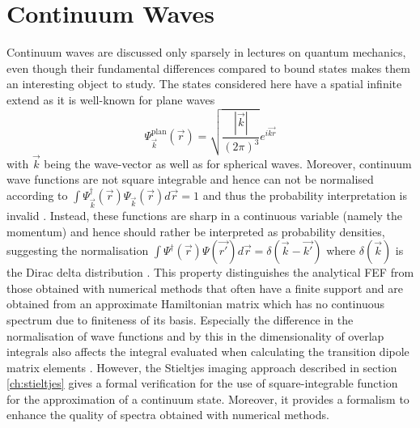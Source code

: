 \section{Continuum Waves}
\label{ch:contwa}
Continuum waves are discussed only sparsely in lectures on quantum mechanics, even though their fundamental differences compared to bound states makes them an interesting object to study.
The states considered here have a spatial infinite extend as it is well-known for plane waves 
\begin{equation}\label{eq:PlWave}
\Psi^\text{plan}_{\vec{k}} (\vec{r})=\sqrt{\frac{|\vec{k}|}{(2\pi)^3}}e^{i\vec{kr}}
\end{equation}
with $\vec{k}$ being the wave-vector as well as for spherical waves. %
Moreover, continuum wave functions are not square integrable and hence can not be normalised according to $\int \Psi_{\vec{k}}^\dagger(\vec{r})\Psi_{\vec{k}}(\vec{r}) d\vec{r}=1$ and thus the probability interpretation is invalid \cite{quirky}.
Instead, these functions are sharp in a continuous variable (namely the momentum) and hence should rather be interpreted as probability densities, suggesting the normalisation 
$\int \Psi^\dagger(\vec{r})\Psi(\vec{r'}) d\vec{r}=\delta(\vec{k}-\vec{k'})$ where $\delta(\vec{k})$ is the Dirac delta distribution \cite{quirky,ContOrb}.
This property distinguishes the analytical FEF from those obtained with numerical methods that often have a finite support and are obtained from an approximate Hamiltonian matrix which has no continuous spectrum due to finiteness of its basis.
Especially the difference in the normalisation of wave functions and by this in the dimensionality of overlap integrals also affects the integral evaluated when calculating the transition dipole matrix elements \cite{stieltjesCeder}.
However, the Stieltjes imaging approach described in section \ref{ch:stieltjes} gives a formal verification for the use of square-integrable function for the approximation of a continuum state. %
Moreover, it provides a formalism to enhance the quality of spectra obtained with numerical methods.

